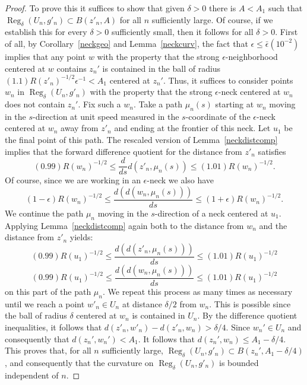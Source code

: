 \begin{proof}
\sketch
To prove this it suffices to show that given $\delta>0$ there is
$A<A_1$ such that $\operatorname{Reg}_\delta(U_n,g'_n)\subset B(z'_n,A)$ for
all $n$ sufficiently large. Of course, if we establish this for
every $\delta>0$ sufficiently small, then it follows for all
$\delta>0$. First of all, by Corollary~\ref{neckgeo} and
Lemma~\ref{neckcurv}, the fact that $\epsilon\le
\bar\epsilon(10^{-2})$ implies that any point $w$ with the property
that the strong $\epsilon$-neighborhood centered at $w$ contains
$z_n'$ is contained in the ball of radius
$(1.1)R(z'_n)^{-1/2}\epsilon^{-1}<A_1$ centered at $z_n'$. Thus, it
suffices to consider points $w_n$ in $\operatorname{Reg}_\delta(U_n,g'_n)$
with the property that the strong $\epsilon$-neck centered at $w_n$
does not contain $z_n'$. Fix such a $w_n$. Take a path $\mu_n(s)$
starting at $w_n$ moving in the $s$-direction at unit speed measured
in the $s$-coordinate of the $\epsilon$-neck centered at $w_n$ away
from $z'_n$ and ending at the frontier of this neck. Let $u_1$ be
the final point of this path. The rescaled version of
Lemma~\ref{neckdistcomp} implies that the forward difference
quotient for the distance from $z'_n$ satisfies
$$(0.99)R(w_n)^{-1/2}\le \frac{d}{ds}d(z'_n,\mu_n(s))
\le (1.01)R(w_n)^{-1/2}.$$ Of course, since we are working in an
$\epsilon$-neck we also have
$$(1-\epsilon)R(w_n)^{-1/2}\le \frac{d(d(w_n,\mu_n(s)))}{ds}\le
(1+\epsilon)R(w_n)^{-1/2}.$$  We continue the path $\mu_n$ moving in
the $s$-direction of a neck centered at $u_1$. Applying
Lemma~\ref{neckdistcomp} again both to the distance from $w_n$ and
the distance from $z'_n$ yields:
$$(0.99)R(u_1)^{-1/2}\le \frac{d(d(z'_n,\mu_n(s)))}
{ds}\le (1.01)R(u_1)^{-1/2}$$
$$(0.99)R(u_1)^{-1/2}\le \frac{d(d(w_n,\mu_n(s)))}
{ds}\le (1.01)R(u_1)^{-1/2}$$ on this part of the path $\mu_n$. We
repeat this process as many times as necessary until we reach a
point $w'_n\in U_n$ at distance $\delta/2$ from $w_n$. This is
possible since the ball of radius $\delta$ centered at $w_n$ is
contained in $U_n$. By the difference quotient inequalities, it
follows that $d(z'_n,w'_n)-d(z'_n,w_n)>\delta/4$.
 Since $w_n'\in U_n$ and
consequently that $d(z_n',w_n')<A_1$. It follows that
$d(z_n',w_n)\le A_1-\delta/4$. This proves that, for all $n$
sufficiently large, $\operatorname{Reg}_\delta(U_n,g'_n)\subset
B(z_n',A_1-\delta/4)$, and consequently that the curvature on
$\operatorname{Reg}_\delta(U_n,g'_n)$ is bounded independent of $n$.
\end{proof}

